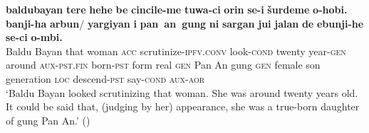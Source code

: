 \documentclass{article}
\newcommand{\ipa}[1]{\textbf{{\phon\mbox{#1}}}} %
\begin{document}
\begin{exe}
\ex 
\gll \ipa{baldubayan} 	\ipa{tere} 	\ipa{hehe} 	\ipa{be} 	\ipa{cincile-me} 	\ipa{tuwa-ci} 	\ipa{orin} 	\ipa{se-i} 	\ipa{šurdeme} 	\ipa{o-hobi.} 	\ipa{banji-ha} 	\ipa{arbun}/ 	\ipa{yargiyan} 	\ipa{i} 	\ipa{pan an gung} 	\ipa{ni} 	\ipa{sargan} 	\ipa{jui} 	\ipa{jalan} 	\ipa{de} 	\ipa{ebunji-he} 	\ipa{se-ci} 	\ipa{o-mbi.} \\
{Baldu Bayan} that woman \textsc{acc} scrutinize-\textsc{ipfv.conv} look-\textsc{cond} twenty year-\textsc{gen} around \textsc{aux-pst.fin}  born-\textsc{pst} form real \textsc{gen} {Pan An gung} \textsc{gen} female son generation \textsc{loc} descend-\textsc{pst} say-\textsc{cond} \textsc{aux-aor} \\
\glt `Baldu Bayan looked scrutinizing that woman. She was around twenty years old. It could be said that, (judging by her) appearance, she was a true-born daughter of gung Pan An.' (\citealt[71,6a-6b/100]{jaxontov93nisan})
\end{exe}



\end{document}
